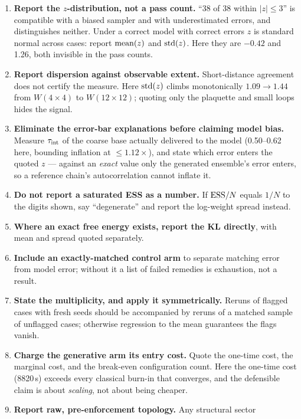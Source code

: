 \begin{enumerate}
  \item \textbf{Report the $z$-distribution, not a pass count.} ``38 of 38
    within $|z| \le 3$'' is compatible with a biased sampler and with
    underestimated errors, and distinguishes neither. Under a correct model
    with correct errors $z$ is standard normal across cases: report
    ${\rm mean}(z)$ and ${\rm std}(z)$. Here they are $-0.42$ and 1.26, both
    invisible in the pass counts.
  \item \textbf{Report dispersion against observable extent.} Short-distance
    agreement does not certify the measure. Here ${\rm std}(z)$ climbs
    monotonically $1.09 \to 1.44$ from $W(4\times4)$ to $W(12\times12)$;
    quoting only the plaquette and small loops hides the signal.
  \item \textbf{Eliminate the error-bar explanations before claiming model
    bias.} Measure $\tau_{\rm int}$ of the coarse base actually delivered to
    the model (0.50--0.62 here, bounding inflation at ${\le}1.12\times$), and
    state which error enters the quoted $z$ --- against an \emph{exact} value
    only the generated ensemble's error enters, so a reference chain's
    autocorrelation cannot inflate it.
  \item \textbf{Do not report a saturated ESS as a number.} If ${\rm ESS}/N$
    equals $1/N$ to the digits shown, say ``degenerate'' and report the
    log-weight spread instead.
  \item \textbf{Where an exact free energy exists, report the KL directly},
    with mean and spread quoted separately.
  \item \textbf{Include an exactly-matched control arm} to separate matching
    error from model error; without it a list of failed remedies is
    exhaustion, not a result.
  \item \textbf{State the multiplicity, and apply it symmetrically.} Reruns
    of flagged cases with fresh seeds should be accompanied by reruns of a
    matched sample of unflagged cases; otherwise regression to the mean
    guarantees the flags vanish.
  \item \textbf{Charge the generative arm its entry cost.} Quote the one-time
    cost, the marginal cost, and the break-even configuration count. Here the
    one-time cost (8820\,s) exceeds every classical burn-in that converges,
    and the defensible claim is about \emph{scaling}, not about being
    cheaper.
  \item \textbf{Report raw, pre-enforcement topology.} Any structural sector

\end{enumerate}
